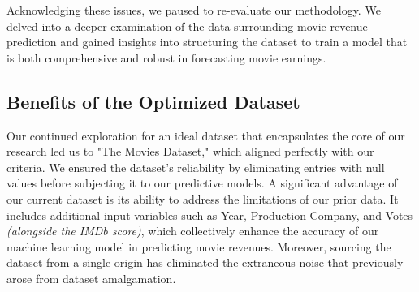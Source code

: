 \documentclass[conference]{IEEEtran}
\begin{document}
        Acknowledging these issues, we paused to re-evaluate our methodology. We delved into a deeper examination of the data surrounding movie revenue prediction and gained insights into structuring the dataset to train a model that is both comprehensive and robust in forecasting movie earnings.

    \subsection{Benefits of the Optimized Dataset}
        Our continued exploration for an ideal dataset that encapsulates the core of our research led us to "The Movies Dataset," which aligned perfectly with our criteria. We ensured the dataset's reliability by eliminating entries with null values before subjecting it to our predictive models. A significant advantage of our current dataset is its ability to address the limitations of our prior data. It includes additional input variables such as Year, Production Company, and Votes \textit{(alongside the IMDb score)}, which collectively enhance the accuracy of our machine learning model in predicting movie revenues. Moreover, sourcing the dataset from a single origin has eliminated the extraneous noise that previously arose from dataset amalgamation.
\end{document}
